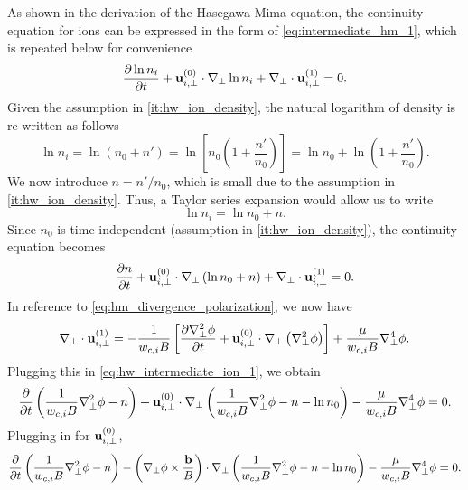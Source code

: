 \documentclass[oneside,a4paper,11pt]{report}
\begin{document}
As shown in the derivation of the Hasegawa-Mima equation, the continuity equation for ions can be expressed in the form of \cref{eq:intermediate_hm_1}, which is repeated below for convenience
\begin{equation}
    \frac{\partial \ln n_i}{\partial t} + \mathbf{u}^{(0)}_{i,\perp} \cdot \nabla_\perp \ln n_i + \nabla_\perp \cdot \mathbf{u}^{(1)}_{i,\perp} = 0.
\end{equation}
Given the assumption in \cref{it:hw_ion_density}, the natural logarithm of density is re-written as follows
\begin{equation}
    \ln n_i = \ln \left ( n_0 + n' \right ) = \ln \left [ n_0 \left ( 1 + \frac{n'}{n_0} \right ) \right ] = \ln n_0 + \ln \left (1 + \frac{n'}{n_0} \right ).
\end{equation}
We now introduce $n = n' / n_0$, which is small due to the assumption in \cref{it:hw_ion_density}. Thus, a Taylor series expansion would allow us to write
\begin{equation}
    \label{eq:hw_ion_density}
    \ln n_i = \ln n_0 + n.
\end{equation}
Since $n_0$ is time independent (assumption in \cref{it:hw_ion_density}), the continuity equation becomes
\begin{equation}
    \label{eq:hw_intermediate_ion_1}
    \frac{\partial n}{\partial t} + \mathbf{u}^{(0)}_{i,\perp} \cdot \nabla_\perp \left ( \ln n_0 + n \right ) + \nabla_\perp \cdot \mathbf{u}^{(1)}_{i,\perp} = 0.
\end{equation}
In reference to \cref{eq:hm_divergence_polarization}, we now have
\begin{equation}
    \nabla_\perp \cdot \mathbf{u}_{i,\perp}^{(1)} = -\frac{1}{w_{c,i} B} \left [ \frac{\partial \nabla_\perp^2 \phi}{\partial t} + \mathbf{u}_{i,\perp}^{(0)} \cdot \nabla_\perp \left ( \nabla_\perp^2 \phi \right ) \right ] + \frac{\mu}{w_{c,i} B} \nabla^4_\perp \phi.
\end{equation}
Plugging this in \cref{eq:hw_intermediate_ion_1}, we obtain
\begin{equation}
    \frac{\partial}{\partial t} \left ( \frac{1}{w_{c,i} B} \nabla^2_\perp \phi - n \right ) + \mathbf{u}^{(0)}_{i,\perp} \cdot \nabla_\perp \left ( \frac{1}{w_{c,i} B} \nabla^2_\perp \phi - n - \ln n_0 \right ) - \frac{\mu}{w_{c,i} B} \nabla^4_\perp \phi = 0.
\end{equation}
Plugging in for $\mathbf{u}^{(0)}_{i,\perp}$,
\begin{equation}
    \label{eq:hw_ion_continuity}
    \frac{\partial}{\partial t} \left ( \frac{1}{w_{c,i} B} \nabla^2_\perp \phi - n \right ) - \left (\nabla_\perp \phi \times \frac{\mathbf{b}}{B} \right ) \cdot \nabla_\perp \left ( \frac{1}{w_{c,i} B} \nabla^2_\perp \phi - n - \ln n_0 \right ) - \frac{\mu}{w_{c,i} B} \nabla^4_\perp \phi = 0.
\end{equation}
\end{document}
